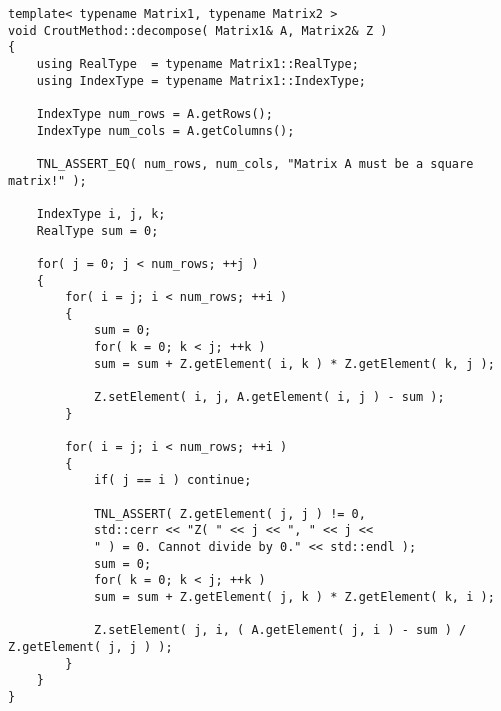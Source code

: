 \begin{lstlisting}[language={},caption={Implementation of the Crout method on the CPU using matrix $ \mathbb{Z} $. Taken from the Decomposition project repository on GitLab\protect\footref{Footnote:decomposition-project-gitlab-url}.},label={Listing:crout-method-implementation-CPU-Z}]
template< typename Matrix1, typename Matrix2 >
void CroutMethod::decompose( Matrix1& A, Matrix2& Z )
{
	using RealType  = typename Matrix1::RealType;
	using IndexType = typename Matrix1::IndexType;
	
	IndexType num_rows = A.getRows();
	IndexType num_cols = A.getColumns();
	
	TNL_ASSERT_EQ( num_rows, num_cols, "Matrix A must be a square matrix!" );
	
	IndexType i, j, k;
	RealType sum = 0;
	
	for( j = 0; j < num_rows; ++j )
	{
		for( i = j; i < num_rows; ++i )
		{
			sum = 0;
			for( k = 0; k < j; ++k )
			sum = sum + Z.getElement( i, k ) * Z.getElement( k, j );
			
			Z.setElement( i, j, A.getElement( i, j ) - sum );
		}
		
		for( i = j; i < num_rows; ++i )
		{
			if( j == i ) continue;
			
			TNL_ASSERT( Z.getElement( j, j ) != 0,
			std::cerr << "Z( " << j << ", " << j <<
			" ) = 0. Cannot divide by 0." << std::endl );
			sum = 0;
			for( k = 0; k < j; ++k )
			sum = sum + Z.getElement( j, k ) * Z.getElement( k, i );
			
			Z.setElement( j, i, ( A.getElement( j, i ) - sum ) / Z.getElement( j, j ) );
		}
	}
}
\end{lstlisting}




